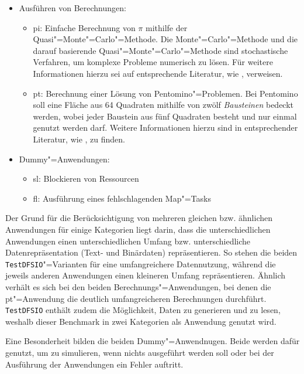 \begin{itemize}
    \item Ausführen von Berechnungen:
    \begin{itemize}
        \item \acrlong{pi}: Einfache Berechnung von $\pi$ mithilfe der Quasi"=Monte"=Carlo"=Methode.
            Die Monte"=Carlo"=Methode und die darauf basierende Quasi"=Monte"=Carlo"=Methode sind stochastische Verfahren, um komplexe Probleme numerisch zu lösen.
            Für weitere Informationen hierzu sei auf entsprechende Literatur, wie \zB \cite{Korn2010,Lemieux2009}, verweisen.
        \item \gls{pt}: Berechnung einer Lösung von Pentomino"=Problemen.
            Bei Pentomino soll eine Fläche aus 64 Quadraten mithilfe von zwölf \emph{Bausteinen} bedeckt werden, wobei jeder Baustein aus fünf Quadraten besteht und nur einmal genutzt werden darf.
            Weitere Informationen hierzu sind in entsprechender Literatur, wie \zB \cite{Golomb1995}, zu finden.
    \end{itemize}

    \item Dummy"=Anwendungen:
    \begin{itemize}
        \item \gls{sl}: Blockieren von Ressourcen
        \item \gls{fl}: Ausführung eines fehlschlagenden Map"=Tasks
    \end{itemize}
\end{itemize}

Der Grund für die Berücksichtigung von mehreren gleichen bzw. ähnlichen Anwendungen für einige Kategorien liegt darin, dass die unterschiedlichen Anwendungen einen unterschiedlichen Umfang bzw. unterschiedliche Datenrepräsentation (Text- und Binärdaten) repräsentieren.
So stehen die beiden \texttt{TestDFSIO}"=Varianten für eine umfangreichere Datennutzung, während die jeweils anderen Anwendungen einen kleineren Umfang repräsentieren.
Ähnlich verhält es sich bei den beiden Berechnungs"=Anwendungen, bei denen die \acrlong{pt}"=Anwendung die deutlich umfangreicheren Berechnungen durchführt.
\texttt{TestDFSIO} enthält zudem die Möglichkeit, Daten zu generieren und zu lesen, weshalb dieser Benchmark in zwei Kategorien als Anwendung genutzt wird.

Eine Besonderheit bilden die beiden Dummy"=Anwendnugen.
Beide werden dafür genutzt, um zu simulieren, wenn nichts ausgeführt werden soll oder bei der Ausführung der Anwendungen ein Fehler auftritt.

